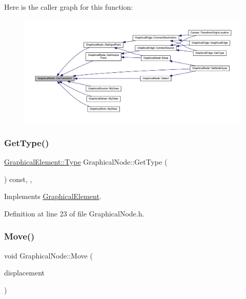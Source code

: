 Here is the caller graph for this function\+:
\nopagebreak
\begin{figure}[H]
\begin{center}
\leavevmode
\includegraphics[width=350pt]{class_graphical_node_a3556bb1d323f16fd394211cf82239f01_icgraph}
\end{center}
\end{figure}
\mbox{\label{class_graphical_node_a6bfbcb9a6b85dd3093a8f6541252ebfe}} 
\subsubsection{\texorpdfstring{Get\+Type()}{GetType()}}
{\footnotesize\ttfamily \hyperlink{class_graphical_element_aa485be48b901d85de97b3bd86f381d9e}{Graphical\+Element\+::\+Type} Graphical\+Node\+::\+Get\+Type (\begin{DoxyParamCaption}{ }\end{DoxyParamCaption}) const\hspace{0.3cm}{\ttfamily [inline]}, {\ttfamily [override]}, {\ttfamily [virtual]}}



Implements \hyperlink{class_graphical_element_a28c3cdbdfa3f295f6afaf463ba3e6157}{Graphical\+Element}.



Definition at line 23 of file Graphical\+Node.\+h.

\mbox{\label{class_graphical_node_a430fbd68a5d907ed9e73981ab3c499fb}} 
\subsubsection{\texorpdfstring{Move()}{Move()}}
{\footnotesize\ttfamily void Graphical\+Node\+::\+Move (\begin{DoxyParamCaption}\item[{wx\+Point2\+D\+Double}]{displacement }\end{DoxyParamCaption})}



